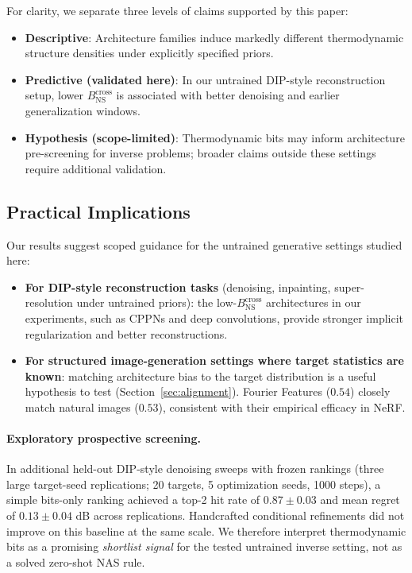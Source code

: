\documentclass{article}
\begin{document}
For clarity, we separate three levels of claims supported by this paper:
\begin{itemize}
    \item \textbf{Descriptive}: Architecture families induce markedly different thermodynamic structure densities under explicitly specified priors.
    \item \textbf{Predictive (validated here)}: In our untrained DIP-style reconstruction setup, lower $B_{\text{NS}}^{\text{cross}}$ is associated with better denoising and earlier generalization windows.
    \item \textbf{Hypothesis (scope-limited)}: Thermodynamic bits may inform architecture pre-screening for inverse problems; broader claims outside these settings require additional validation.
\end{itemize}

\subsection{Practical Implications}

Our results suggest scoped guidance for the untrained generative settings studied here:

\begin{itemize}
    \item \textbf{For DIP-style reconstruction tasks} (denoising, inpainting, super-resolution under untrained priors): the low-$B_{\text{NS}}^{\text{cross}}$ architectures in our experiments, such as CPPNs and deep convolutions, provide stronger implicit regularization and better reconstructions.

    \item \textbf{For structured image-generation settings where target statistics are known}: matching architecture bias to the target distribution is a useful hypothesis to test (Section~\ref{sec:alignment}). Fourier Features ($0.54$) closely match natural images ($0.53$), consistent with their empirical efficacy in NeRF.
\end{itemize}

\paragraph{Exploratory prospective screening.} In additional held-out DIP-style denoising sweeps with frozen rankings (three large target-seed replications; 20 targets, 5 optimization seeds, 1000 steps), a simple bits-only ranking achieved a top-2 hit rate of $0.87 \pm 0.03$ and mean regret of $0.13 \pm 0.04$ dB across replications. Handcrafted conditional refinements did not improve on this baseline at the same scale. We therefore interpret thermodynamic bits as a promising \emph{shortlist signal} for the tested untrained inverse setting, not as a solved zero-shot NAS rule.
\end{document}
